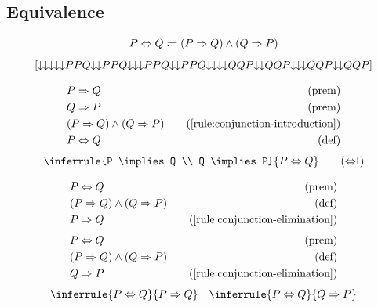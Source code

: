 \subsection{Equivalence}

\newcommand{\norlequiv}[2]{\norwedge{\norimplies{#1}{#2}}{\norimplies{#2}{#1}}} %
\begin{notation}
    \[P \Leftrightarrow Q \coloneqq (P \Rightarrow Q) \wedge (Q \Rightarrow P)\]
    \[[\norlequiv{P}{Q}]\]
\end{notation}

\begin{align*}
    & \hspace{0em} P \Rightarrow Q & \quad (\text{prem})\\
    & \hspace{0em} Q \Rightarrow P & \quad (\text{prem})\\
    & \hspace{0em} (P \Rightarrow Q) \wedge (Q \Rightarrow P) & \quad (\text{\ref{rule:conjunction-introduction}})\\
    & \hspace{0em} P \Leftrightarrow Q & \quad (\text{def})
\end{align*}
\begin{equation}
    \inferrule{P \implies Q \\ Q \implies P}{P \lequiv Q}
    \tag{{$\lequiv$}I}
    \label{rule:equivalence-introduction}
\end{equation}

\begin{align*}
    & \hspace{0em} P \Leftrightarrow Q & \quad (\text{prem})\\
    & \hspace{0em} (P \Rightarrow Q) \wedge (Q \Rightarrow P) & \quad (\text{def})\\
    & \hspace{0em} P \Rightarrow Q & \quad (\text{\ref{rule:conjunction-elimination}})
\end{align*}
\begin{align*}
    & \hspace{0em} P \Leftrightarrow Q & \quad (\text{prem})\\
    & \hspace{0em} (P \Rightarrow Q) \wedge (Q \Rightarrow P) & \quad (\text{def})\\
    & \hspace{0em} Q \Rightarrow P & \quad (\text{\ref{rule:conjunction-elimination}})
\end{align*}
\begin{equation}
    \inferrule{P \lequiv Q}{P \implies Q} \quad \inferrule{P \lequiv Q}{Q \implies P}
    \label{rule:equivalence-unpacking}
\end{equation}

